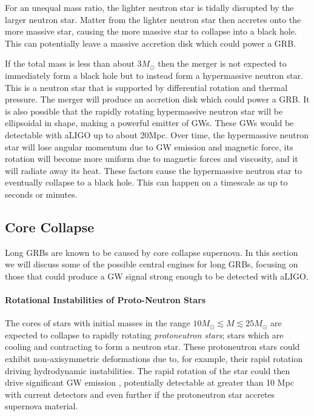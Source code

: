 \documentclass[11pt]{cuthesis}
\begin{document}
For an unequal mass ratio, the lighter neutron star is tidally disrupted by the larger neutron star. Matter from the lighter neutron star then accretes onto the more massive star, causing the more massive star to collapse into a black hole. This can potentially leave a massive accretion disk which could power a GRB.  

If the total mass is less than about 3$M_\odot$\cite{gw_grb_paradigm} then the merger is not expected to immediately form a black hole but to instead form a hypermassive neutron star. This is a neutron star that is supported by differential rotation and thermal pressure. The merger will produce an accretion disk which could power a GRB. It is also possible that the rapidly rotating hypermassive neutron star will be ellipsoidal in shape, making a powerful emitter of GWs. These GWs would be detectable with aLIGO up to about 20Mpc\cite{gw_grb_paradigm}. Over time, the hypermassive neutron star will lose angular momentum due to GW emission and magnetic force, its rotation will become more uniform due to magnetic forces and viscosity, and it will radiate away its heat. These factors cause the hypermassive neutron star to eventually collapse to a black hole. This can happen on a timescale as up to seconds or minutes\cite{Baiotti_2017,Faber2012}. 

\subsection{Core Collapse}
Long GRBs are known to be caused by core collapse supernova. In this section we will discuss some of the possible central engines for long GRBs, focusing on those that could produce a GW signal strong enough to be detected with aLIGO. 

\paragraph{Rotational Instabilities of Proto-Neutron Stars} 
The cores of stars with initial masses in the range $10M_\odot \lesssim M \lesssim 25M_\odot$ are expected to collapse to rapidly rotating \textit{protoneutron stars}; stars which are cooling and contracting to form a neutron star. These protoneutron stars could exhibit non-axisymmetric deformations due to, for example, their rapid rotation driving hydrodynamic instabilities.  The rapid rotation of the star could then drive significant GW emission \cite{Stergioulas2003}, potentially detectable at greater than 10 Mpc with current detectors and even further if the protoneutron star accretes supernova material.\cite{gw_grb_paradigm} 
\end{document}
